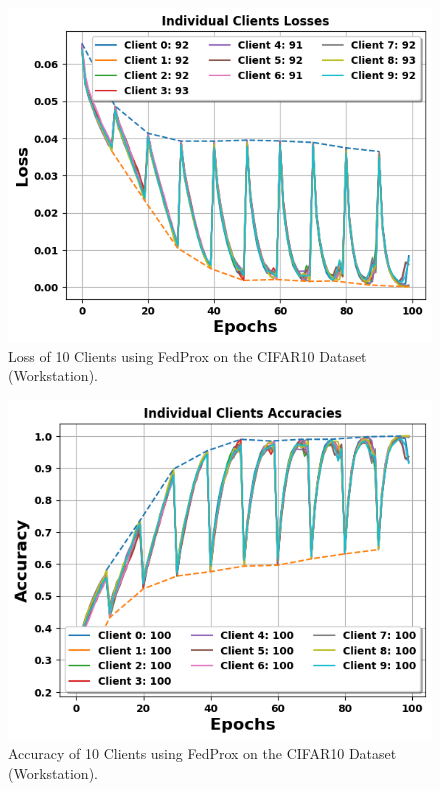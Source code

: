 \documentclass[conference]{IEEEtran}
\begin{document}
\begin{figure}[htp!]
	\centering
	\includegraphics[scale=.51]{Images/NEWGRAPHS/loss_fedprox.png }
	\caption{Loss of 10 Clients using FedProx on the CIFAR10 Dataset (Workstation).}
	\label{lossFedProxC10}
\end{figure}

\begin{figure}[htp!]
	\centering
	\includegraphics[scale=.51]{Images/NEWGRAPHS/acc_fedprox.png }
	\caption{Accuracy of 10 Clients using FedProx on the CIFAR10 Dataset (Workstation).}
	\label{accFedProxC10}
\end{figure}
\end{document}
